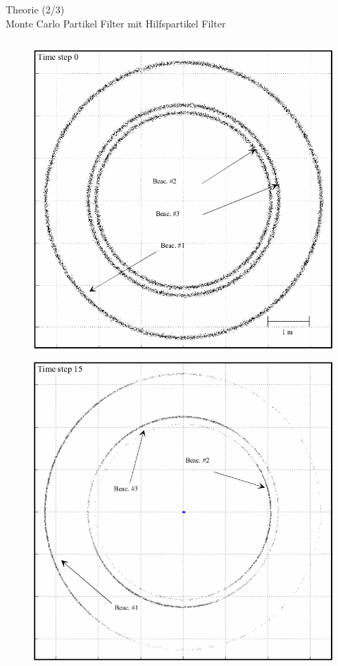 \documentclass{beamer}
\begin{document}
\begin{frame}{Theorie (2/3)\\Monte Carlo Partikel Filter mit Hilfspartikel Filter}
	\begin{columns}
			\begin{overlayarea}{\textwidth}{.9\textheight}
				\only<1>
				{
					\begin{figure}
						\centering
						\includegraphics[width=\linewidth]{blanco2008pure_fig3e}
						\caption{\cite{blanco2008pure}}
					\end{figure}
				}
				{
					\begin{figure}
						\centering
						\includegraphics[width=\linewidth]{blanco2008pure_fig3f}

\end{figure}}
\end{overlayarea}
\end{columns}
\end{frame}
\end{document}
